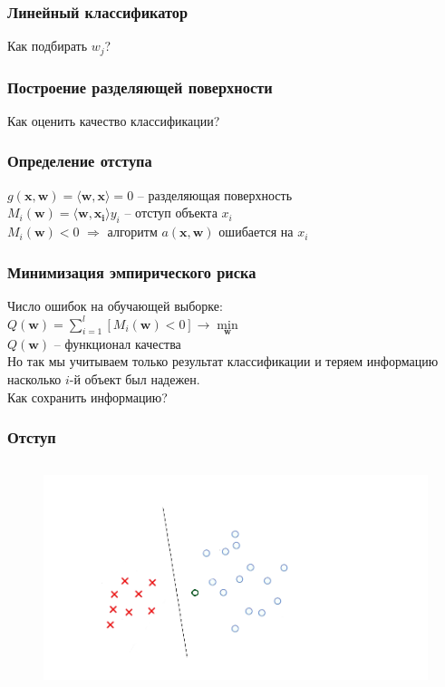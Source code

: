 \documentclass[12pt]{beamer}
\begin{document}
\begin{frame}\frametitle{Линейный классификатор}
Как подбирать $w_j$?
\end{frame}

\begin{frame}\frametitle{Построение разделяющей поверхности}
Как оценить качество классификации?
\end{frame}

\begin{frame}\frametitle{Определение отступа}
${g(\mathbf{x}, \mathbf{w}) = \langle \mathbf{w}, \mathbf{x}\rangle = 0}$ -- разделяющая поверхность\\
$M_i(\mathbf{w}) = \langle \mathbf{w}, \mathbf{x_i}\rangle y_i$ -- отступ объекта $x_i$\\
${M_i(\mathbf{w})<0}$ $\Rightarrow$ алгоритм $a(\mathbf{x},\mathbf{w})$ ошибается на $x_i$
\end{frame}

\begin{frame}\frametitle{Минимизация эмпирического риска}
Число ошибок на обучающей выборке:\\
\vspace{5mm}
${Q(\mathbf{w}) = \sum\limits_{i=1}^l \left[ M_i(\mathbf{w}) < 0 \right] \rightarrow \min\limits_{\mathbf{w}} }$\\
\vspace{3mm}
${Q(\mathbf{w})}$ -- функционал качества\\
\vspace{5mm}
Но так мы учитываем только результат классификации и теряем информацию насколько ${i}$-й объект был надежен.\\
\vspace{3mm}
Как сохранить информацию?

\end{frame}

\begin{frame}\frametitle{Отступ}
\begin{figure}[htbp]
  \includegraphics[height=190pt, keepaspectratio = true]{images/margin1}   
\end{figure}
\end{frame}
\end{document}
